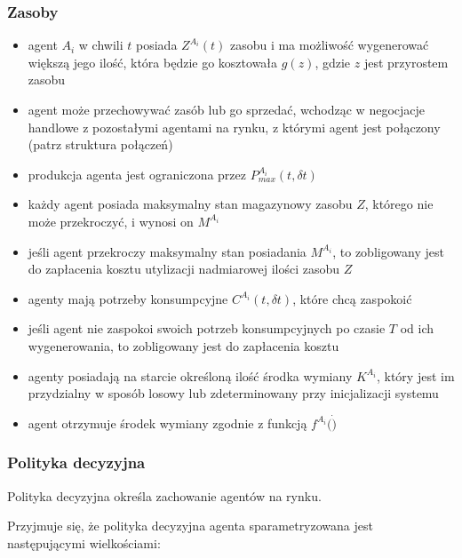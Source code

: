 \documentclass{article}
\providecommand{\tightlist}{%
  \setlength{\itemsep}{0pt}\setlength{\parskip}{0pt}}
\begin{document}
\subsubsection{Zasoby}
\begin{itemize}
\tightlist
\item
  agent \(A_i\) w chwili \(t\) posiada \(Z^{A_i}(t)\) zasobu i ma
  możliwość wygenerować większą jego ilość, która będzie go kosztowała
  \(g(z)\), gdzie \(z\) jest przyrostem zasobu
\item
  agent może przechowywać zasób lub go sprzedać, wchodząc w negocjacje
  handlowe z pozostałymi agentami na rynku, z którymi agent jest
  połączony (patrz struktura połączeń)
\item
  produkcja agenta jest ograniczona przez \(P^{A_i}_{max}(t, \delta t)\)
\item
  każdy agent posiada maksymalny stan magazynowy zasobu \(Z\), którego
  nie może przekroczyć, i wynosi on \(M^{A_i}\)
\item
  jeśli agent przekroczy maksymalny stan posiadania \(M^{A_i}\), to
  zobligowany jest do zapłacenia kosztu utylizacji nadmiarowej ilości
  zasobu \(Z\)
\item
  agenty mają potrzeby konsumpcyjne \(C^{A_i}(t, \delta t)\), które chcą
  zaspokoić
\item
  jeśli agent nie zaspokoi swoich potrzeb konsumpcyjnych po czasie \(T\)
  od ich wygenerowania, to zobligowany jest do zapłacenia kosztu
\item
  agenty posiadają na starcie określoną ilość środka wymiany
  \(K^{A_i}\), który jest im przydzialny w sposób losowy lub
  zdeterminowany przy inicjalizacji systemu
\item
  agent otrzymuje środek wymiany zgodnie z funkcją \(f^{A_i}(\dot)\)
\end{itemize}

\subsubsection{Polityka decyzyjna}

Polityka decyzyjna określa zachowanie agentów na rynku.

Przyjmuje się, że polityka decyzyjna agenta sparametryzowana jest
następującymi wielkościami:
\end{document}
